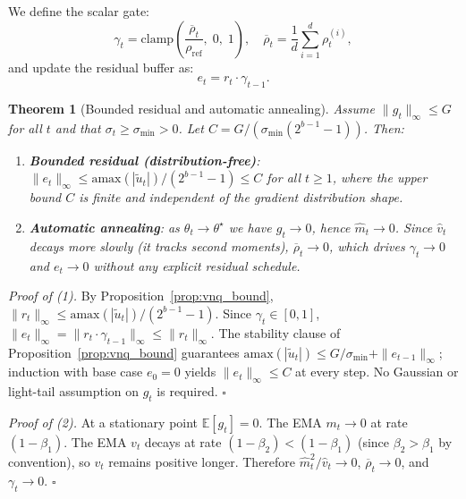 \documentclass[10pt,twocolumn]{article}
\newtheorem{theorem}{Theorem}
\begin{document}
We define the scalar gate:
\begin{equation}
  \gamma_t = \mathrm{clamp}\!\left(
    \frac{\overline{\rho}_{t}}{\rho_{\text{ref}}},\; 0,\; 1
  \right),
  \quad
  \overline{\rho}_{t} = \frac{1}{d} \sum_{i=1}^d \rho_t^{(i)},
  \label{eq:gate}
\end{equation}
and update the residual buffer as:
\begin{equation}
  e_t = r_t \cdot \gamma_{t-1}.
  \label{eq:gated_residual}
\end{equation}

\begin{theorem}[Bounded residual and automatic annealing]
\label{thm:bounded_residual}
Assume $\|g_t\|_\infty \le G$ for all $t$ and that $\sigma_t \ge
\sigma_{\min} > 0$.  Let $C = G / (\sigma_{\min}(2^{b-1}-1))$.  Then:
\begin{enumerate}
  \item \textbf{Bounded residual (distribution-free)}: $\|e_t\|_\infty
    \le \mathrm{amax}(|\tilde{u}_t|) / (2^{b-1}-1) \le C$ for all
    $t \ge 1$, where the upper bound $C$ is finite and independent of
    the gradient distribution shape.
  \item \textbf{Automatic annealing}: as $\theta_t \to \theta^\star$
    we have $g_t \to 0$, hence $\hat{m}_t \to 0$.  Since $\hat{v}_t$
    decays more slowly (it tracks second moments), $\overline{\rho}_t
    \to 0$, which drives $\gamma_t \to 0$ and $e_t \to 0$ without any
    explicit residual schedule.
\end{enumerate}
\end{theorem}

\textit{Proof of (1).}
By Proposition~\ref{prop:vnq_bound}, $\|r_t\|_\infty \le
\mathrm{amax}(|\tilde{u}_t|) / (2^{b-1}-1)$.  Since $\gamma_t \in
[0,1]$, $\|e_t\|_\infty = \|r_t \cdot \gamma_{t-1}\|_\infty \le
\|r_t\|_\infty$.  The stability clause of
Proposition~\ref{prop:vnq_bound} guarantees $\mathrm{amax}(|\tilde{u}_t|)
\le G/\sigma_{\min} + \|e_{t-1}\|_\infty$; induction with base case
$e_0 = 0$ yields $\|e_t\|_\infty \le C$ at every step.  No Gaussian
or light-tail assumption on $g_t$ is required. \hfill$\square$

\textit{Proof of (2).}
At a stationary point $\mathbb{E}[g_t] = 0$.  The EMA $m_t \to 0$
at rate $(1-\beta_1)$.  The EMA $v_t$ decays at rate $(1-\beta_2) <
(1-\beta_1)$ (since $\beta_2 > \beta_1$ by convention), so $v_t$
remains positive longer.  Therefore $\hat{m}_t^2 / \hat{v}_t \to 0$,
$\overline{\rho}_t \to 0$, and $\gamma_t \to 0$. \hfill$\square$
\end{document}
